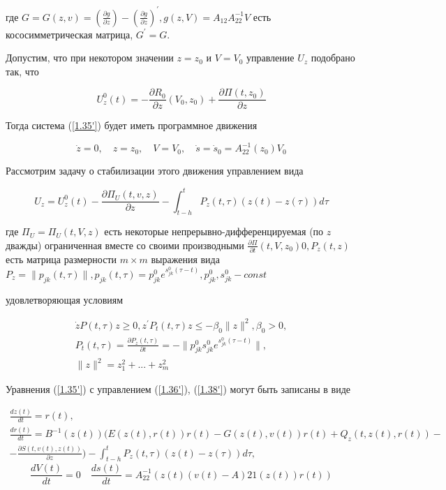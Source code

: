 где $G = G(z, v) = (\frac{\partial g}{\partial z}) - (\frac{\partial g}{\partial z})^{'}, g(z, V) = A_{12} A_{22}^{-1} V$ есть кососимметрическая матрица, $G^{'} = G$.

Допустим, что при некотором значении $z = z_0$ и $V = V_0$ управление $U_z$ подобрано так, что 

\begin{equation} \label{1.38'}
U_z^0 (t) = - \frac{\partial R_0}{\partial z} (V_0, z_0) + \frac{\partial \Pi (t, z_0)}{\partial z}
\end{equation}

Тогда система (\ref{1.35'}) будет иметь программное движения 

\begin{equation} \label{1.39'}
\dot z = 0, \quad z = z_0, \quad V = V_0, \quad \dot s = \dot s_0 = A_{22}^{-1} (z_0) V_0
\end{equation}

Рассмотрим задачу о стабилизации этого движения управлением вида 

\begin{equation} \label{1.40'}
U_z = U_z^0 (t) - \frac{\partial \Pi_U (t, v, z)}{\partial z} - \int_{t - h}^{t} P_z (t, \tau) (z(t) - z(\tau)) d \tau
\end{equation}

где $\Pi_U = \Pi_U (t, V, z)$ есть некоторые непрерывно-дифференцируемая (по $z$ дважды) ограниченная вместе со своими производными $\frac{\partial \Pi}{\partial t} (t, V, z_0) 0 , P_z(t, z)$ есть матрица размерности $m \times m$ выражения вида $P_z = \| p_{jk} (t, \tau) \|, p_{jk} (t, \tau) = p_{jk}^0 e^{s_{jk}^0 (\tau - t)}, p_{jk}^0, s_{jk}^0 - const$

удовлетворяющая условиям

\begin{equation} \label{1.41'}
\begin{array}{c}
\dot z P(t, \tau) z \ge 0, z^{'} P_t (t, \tau) z \le - \beta_0 \| z \|^2, \beta_0 > 0,\\
P_t (t, \tau) = \frac{\partial P_z (t, \tau)}{\partial t} = - \| p_{jk}^0 s_{jk}^0 e^{s_{jk}^0 (\tau - t)} \|,\\
\| z \| ^ 2 = z_1^2 + ... + z_m^2
\end{array}
\end{equation}

Уравнения (\ref{1.35'}) с управлением (\ref{1.36'}), (\ref{1.38'}) могут быть записаны в виде

\begin{equation} \label{1.42'}
\begin{array}{c}
\displaystyle \frac{d z (t)}{dt} = r(t),\\
\displaystyle \frac{d r(t)}{dt} = B^{-1} (z(t)) (E(z(t), r(t)) r(t) - G(z(t), v(t)) r(t) + Q_z (t, z(t), r(t)) -\\
\displaystyle - \frac{\partial S(t, v(t), z(t))}{\partial z}) - \int_{t - h}^{t} P_z (t, \tau) (z(t) - z(\tau)) d \tau,
\end{array}
\end{equation}
$$\frac{d V(t)}{dt} = 0 \quad \frac{d s(t)}{dt} = A_{22}^{-1} (z(t) (v(t) - A){21} (z(t)) r(t))$$

